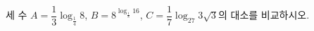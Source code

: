 세 수 $A=\dfrac{1}{3}\log_{\frac{1}{4}} 8$, $B=8^{\log_{\frac{1}{8}} 16}$, $C=\dfrac{1}{7}\log_{27} 3\sqrt{3}$의 대소를 비교하시오.
